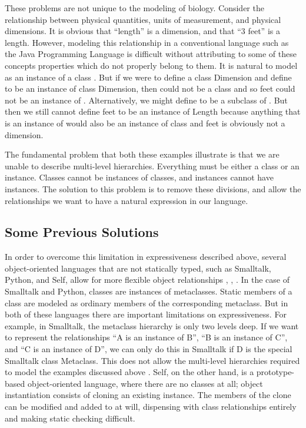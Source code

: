 \documentclass[10pt]{acm-sigplan}
\begin{document}
These problems are not unique to the modeling of biology.  Consider
the relationship between physical quantities, units of measurement,
and physical dimensions. It is obvious that ``length'' is a dimension,
and that ``3 feet'' is a length.  However, modeling this relationship
in a conventional language such as the Java Programming Language is
difficult without attributing to some of these concepts properties
which do not properly belong to them.  It is natural to model {} as an instance of a class {}. But if we were to
define a class {\txt Dimension} and define {} to be an
instance of class {\txt Dimension}, then {} could not be a
class and so { feet} could not be an instance of {}.
Alternatively, we might define {} to be a subclass of
{}. But then we still cannot define { feet} to be
an instance of {\txt Length} because anything that is an instance of
{} would also be an instance of class {}
and { feet} is obviously not a dimension. 

The fundamental problem that both these examples illustrate is that we
are unable to describe multi-level  hierarchies.
Everything must be either a class or an instance.  Classes cannot be
instances of classes, and instances cannot have instances.  The
solution to this problem is to remove these divisions, and allow
the relationships we want to have a natural expression in our
language.

\subsection{Some Previous Solutions}
In order to overcome this limitation in expressiveness described
above, several object-oriented languages that are not statically
typed, such as Smalltalk, Python, and Self, allow for more flexible
object relationships \cite{Smalltalk80}, \cite{ArtMOP},
\cite{PythonMeta}. In the case of Smalltalk and Python, classes are
instances of metaclasses. Static members of a class are modeled as
ordinary members of the corresponding metaclass.  But in both of these
languages there are important limitations on expressiveness.  For
example, in Smalltalk, the metaclass hierarchy is only two levels
deep.  If we want to represent the relationships ``{\txt A} is an
instance of {\txt B}'', ``{\txt B} is an instance of {\txt C}'', and
``{\txt C} is an instance of {\txt D}'', we can only do this in
Smalltalk if {\txt D} is the special Smalltalk class {\txt Metaclass}.
This does not allow the multi-level hierarchies required to model the
examples discussed above \cite{Smalltalk80}.  Self, on the other hand,
is a prototype-based object-oriented language, where there are no
classes at all; object instantiation consists of cloning an existing
instance.  The members of the clone can be modified and added to at
will, dispensing with class relationships entirely and making static
checking difficult.
\end{document}
